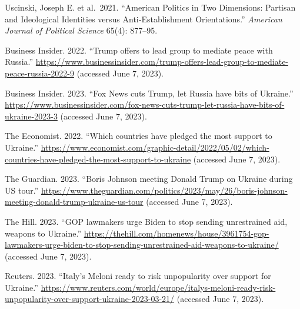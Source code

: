 \documentclass[
]{article}
\begin{document}
Uscinski, Joseph E. et al.~2021. ``American Politics in Two Dimensions:
Partisan and Ideological Identities versus Anti‐Establishment
Orientations.'' \emph{American Journal of Political Science} 65(4):
877--95.

Business Insider. 2022. ``Trump offers to lead group to mediate peace
with Russia.''
\url{https://www.businessinsider.com/trump-offers-lead-group-to-mediate-peace-russia-2022-9}
(accessed June 7, 2023).

Business Insider. 2023. ``Fox News cuts Trump, let Russia have bits of
Ukraine.''
\url{https://www.businessinsider.com/fox-news-cuts-trump-let-russia-have-bits-of-ukraine-2023-3}
(accessed June 7, 2023).

The Economist. 2022. ``Which countries have pledged the most support to
Ukraine.''
\url{https://www.economist.com/graphic-detail/2022/05/02/which-countries-have-pledged-the-most-support-to-ukraine}
(accessed June 7, 2023).

The Guardian. 2023. ``Boris Johnson meeting Donald Trump on Ukraine
during US tour.''
\url{https://www.theguardian.com/politics/2023/may/26/boris-johnson-meeting-donald-trump-ukraine-us-tour}
(accessed June 7, 2023).

The Hill. 2023. ``GOP lawmakers urge Biden to stop sending unrestrained
aid, weapons to Ukraine.''
\url{https://thehill.com/homenews/house/3961754-gop-lawmakers-urge-biden-to-stop-sending-unrestrained-aid-weapons-to-ukraine/}
(accessed June 7, 2023).

Reuters. 2023. ``Italy's Meloni ready to risk unpopularity over support
for Ukraine.''
\url{https://www.reuters.com/world/europe/italys-meloni-ready-risk-unpopularity-over-support-ukraine-2023-03-21/}
(accessed June 7, 2023).
\end{document}
